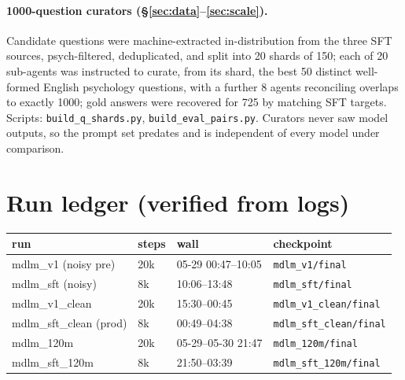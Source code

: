 \documentclass[11pt]{article}
\newcommand{\repo}[1]{\texttt{\footnotesize #1}}
\begin{document}
\paragraph{1000-question curators (\S\ref{sec:data}--\ref{sec:scale}).} Candidate questions were machine-extracted in-distribution from the three SFT sources, psych-filtered, deduplicated, and split into 20 shards of 150; each of 20 sub-agents was instructed to curate, from its shard, the best 50 distinct well-formed English psychology questions, with a further 8 agents reconciling overlaps to exactly 1000; gold answers were recovered for 725 by matching SFT targets. Scripts: \repo{build\_q\_shards.py}, \repo{build\_eval\_pairs.py}. Curators never saw model outputs, so the prompt set predates and is independent of every model under comparison.

\section{Run ledger (verified from logs)}\label{app:runs}
\begin{center}\small
\begin{tabular}{llll}
\toprule
run & steps & wall & checkpoint \\
\midrule
mdlm\_v1 (noisy pre) & 20k & 05-29 00:47--10:05 & \repo{mdlm\_v1/final} \\
mdlm\_sft (noisy) & 8k & 10:06--13:48 & \repo{mdlm\_sft/final} \\
mdlm\_v1\_clean & 20k & 15:30--00:45 & \repo{mdlm\_v1\_clean/final} \\
mdlm\_sft\_clean (prod) & 8k & 00:49--04:38 & \repo{mdlm\_sft\_clean/final} \\
mdlm\_120m & 20k & 05-29--05-30 21:47 & \repo{mdlm\_120m/final} \\
mdlm\_sft\_120m & 8k & 21:50--03:39 & \repo{mdlm\_sft\_120m/final} \\
\bottomrule
\end{tabular}
\end{center}
\end{document}
